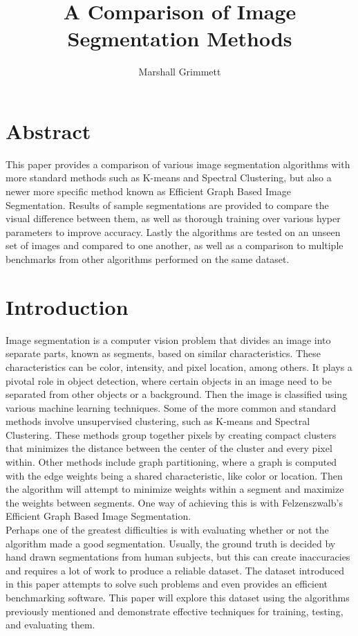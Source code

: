\documentclass[12pt]{extarticle}
\title{A Comparison of Image Segmentation Methods}
\author{Marshall Grimmett}
\begin{document}
\setlength{\parindent}{0pt}
\maketitle


\section*{\centering Abstract}
  This paper provides a comparison of various image segmentation algorithms
  with more standard methods such as K-means and Spectral Clustering, but 
  also a newer more specific method known as Efficient Graph Based Image 
  Segmentation. Results of sample segmentations are provided to compare the
  visual difference between them, as well as thorough training over various
  hyper parameters to improve accuracy. Lastly the algorithms are tested on 
  an unseen set of images and compared to one another, as well as a
  comparison to multiple benchmarks from other algorithms performed
  on the same dataset.

\section{Introduction}
  Image segmentation is a computer vision problem that divides an image into
  separate parts, known as segments, based on similar characteristics. These
  characteristics can be color, intensity, and pixel location, among others.
  It plays a pivotal role in object detection, where certain objects in an 
  image need to be separated from other objects or a background. Then the image
  is classified using various machine learning techniques. Some of the more 
  common and standard methods involve unsupervised clustering, such as 
  K-means and Spectral Clustering. These methods group together pixels by 
  creating compact clusters that minimizes the distance between the center
  of the cluster and every pixel within. Other methods include graph
  partitioning, where a graph is computed with the edge weights being a 
  shared characteristic, like color or location. Then the algorithm will 
  attempt to minimize weights within a segment and maximize the weights between
  segments. One way of achieving this is with Felzenszwalb's Efficient Graph
  Based Image Segmentation.
  \\
  Perhaps one of the greatest difficulties is with evaluating whether or not 
  the algorithm made a good segmentation. Usually, the ground truth is decided
  by hand drawn segmentations from human subjects, but this can create
  inaccuracies and requires a lot of work to produce a reliable dataset.
  The dataset introduced in this paper attempts to solve such problems and 
  even provides an efficient benchmarking software. This paper will explore
  this dataset using the algorithms previously mentioned and demonstrate 
  effective techniques for training, testing, and evaluating them.
\end{document}

